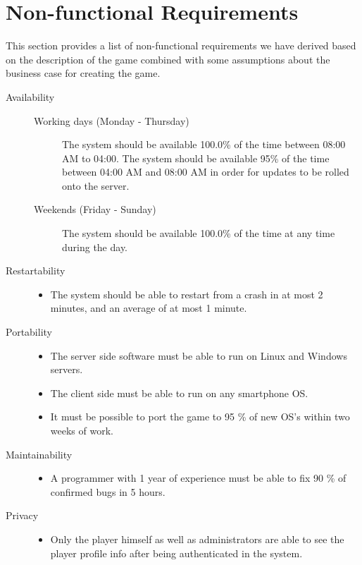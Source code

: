\section{Non-functional Requirements}
This section provides a list of non-functional requirements we have derived based on the description of the game combined with some assumptions about the business case for creating the game.
\begin{description}

\item [Availability] \hfill 
	\begin{description}
		\item[Working days (Monday - Thursday)] The system should be available 100.0\% of the time between 08:00 AM to 04:00. The system should be available 95\% of the time between 04:00 AM and 08:00 AM in order for updates to be rolled onto the server.
		\item[Weekends (Friday - Sunday)] The system should be available 100.0\% of the time at any time during the day. 
	\end{description}

\item [Restartability] \hfill 
	\begin{itemize}
	   \item The system should be able to restart from a crash in at most 2 minutes, and an average of at most 1 minute.
	\end{itemize}

\item [Portability] \hfill 
	\begin{itemize}
		\item The server side software must be able to run on Linux and Windows servers.
		\item The client side must be able to run on any smartphone OS.
		\item It must be possible to port the game to 95 \% of new OS's within two weeks of work.
	\end{itemize}

\item [Maintainability] \hfill 
	\begin{itemize}
	  	\item A programmer with 1 year of experience must be able to fix 90 \% of confirmed bugs in 5 hours.
	\end{itemize}



\item [Privacy] \hfill 
	\begin{itemize}
		\item Only the player himself as well as administrators are able to see the player profile info after being authenticated in the system.
	\end{itemize}


\end{description}

